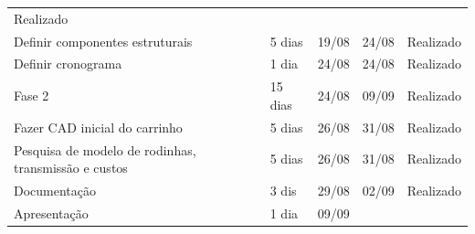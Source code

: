 \begin{table}[H]
{\begin{tabular}{ l l l l l }
    \multicolumn{1}{p{1.833cm}|}{Realizado \centering }
  \\  
  \cline{1-1}\cline{2-2}\cline{3-3}\cline{4-4}\cline{5-5}  
    \multicolumn{1}{|p{3.867cm}|}{Definir componentes estruturais} &
    \multicolumn{1}{p{1.700cm}|}{5 dias \centering } &
    \multicolumn{1}{p{1.133cm}|}{19/08 \centering } &
    \multicolumn{1}{p{0.967cm}|}{24/08 \centering } &
    \multicolumn{1}{p{1.833cm}|}{Realizado \centering }
  \\  
  \cline{1-1}\cline{2-2}\cline{3-3}\cline{4-4}\cline{5-5}  
    \multicolumn{1}{|p{3.867cm}|}{Definir cronograma} &
    \multicolumn{1}{p{1.700cm}|}{1 dia \centering } &
    \multicolumn{1}{p{1.133cm}|}{24/08 \centering } &
    \multicolumn{1}{p{0.967cm}|}{24/08 \centering } &
    \multicolumn{1}{p{1.833cm}|}{Realizado \centering }
  \\  
  \cline{1-1}\cline{2-2}\cline{3-3}\cline{4-4}\cline{5-5}  
    \multicolumn{1}{|p{3.867cm}|}{Fase 2} &
    \multicolumn{1}{p{1.700cm}|}{15 dias \centering } &
    \multicolumn{1}{p{1.133cm}|}{24/08 \centering } &
    \multicolumn{1}{p{0.967cm}|}{09/09 \centering } &
    \multicolumn{1}{p{1.833cm}|}{Realizado \centering }
  \\  
  \cline{1-1}\cline{2-2}\cline{3-3}\cline{4-4}\cline{5-5}  
    \multicolumn{1}{|p{3.867cm}|}{Fazer CAD inicial do carrinho} &
    \multicolumn{1}{p{1.700cm}|}{5 dias \centering } &
    \multicolumn{1}{p{1.133cm}|}{26/08 \centering } &
    \multicolumn{1}{p{0.967cm}|}{31/08 \centering } &
    \multicolumn{1}{p{1.833cm}|}{Realizado \centering }
  \\  
  \cline{1-1}\cline{2-2}\cline{3-3}\cline{4-4}\cline{5-5}  
    \multicolumn{1}{|p{3.867cm}|}{Pesquisa de modelo de rodinhas, transmissão e custos} &
    \multicolumn{1}{p{1.700cm}|}{5 dias \centering } &
    \multicolumn{1}{p{1.133cm}|}{26/08 \centering } &
    \multicolumn{1}{p{0.967cm}|}{31/08 \centering } &
    \multicolumn{1}{p{1.833cm}|}{Realizado \centering }
  \\  
  \cline{1-1}\cline{2-2}\cline{3-3}\cline{4-4}\cline{5-5}  
    \multicolumn{1}{|p{3.867cm}|}{Documentação} &
    \multicolumn{1}{p{1.700cm}|}{3 dis \centering } &
    \multicolumn{1}{p{1.133cm}|}{29/08 \centering } &
    \multicolumn{1}{p{0.967cm}|}{02/09 \centering } &
    \multicolumn{1}{p{1.833cm}|}{Realizado \centering }
  \\  
  \cline{1-1}\cline{2-2}\cline{3-3}\cline{4-4}\cline{5-5}  
    \multicolumn{1}{|p{3.867cm}|}{Apresentação} &
    \multicolumn{1}{p{1.700cm}|}{1 dia \centering } &
    \multicolumn{1}{p{1.133cm}|}{09/09 \centering } &

\end{tabular}}
\end{table}

